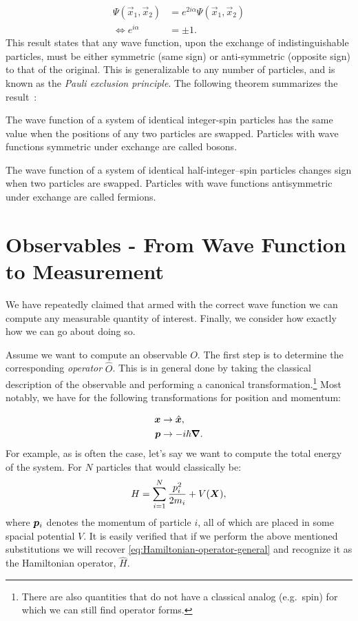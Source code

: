 \documentclass[Thesis.tex]{subfiles}
\begin{document}
\begin{align}
    \Psi(\vec x_1,\vec x_2) &= e^{2i\alpha}\Psi(\vec x_1, \vec x_2)\\
    \iff e^{i\alpha} &= \pm 1.
\end{align}
This result states that any wave function, upon the exchange of
indistinguishable particles, must be either symmetric (same sign) or
anti-symmetric (opposite sign) to that of the original. This is generalizable to
any number of particles, and is known as the \emph{Pauli exclusion principle}.
The following theorem summarizes the result~\cite{PhysRev-58-716}:

\begin{theorem}\label{theorem:spin-statistic}

    The wave function of a system of identical integer-spin particles has the same value
    when the positions of any two particles are swapped. Particles with wave functions
    symmetric under exchange are called bosons.

    The wave function of a system of identical half-integer–spin particles changes sign
    when two particles are swapped. Particles with wave functions antisymmetric under
    exchange are called fermions.
\end{theorem}

\section{Observables - From Wave Function to Measurement}
\label{sec:obs-from-psi-to-Q}

We have repeatedly claimed that armed with the correct wave function we can compute any
measurable quantity of interest. Finally, we consider how exactly how we can go
about doing so.

Assume we want to compute an observable $O$. The first step is to determine the
corresponding \emph{operator} $\hat O$. This is in general done by taking the classical
description of the observable and performing a canonical transformation.\footnote{There are
also quantities that do not have a classical analog (e.g.\ spin) for which we can still
find operator forms.} Most notably, we have for the following transformations for
position and momentum:

\begin{align}
    \bm{x} &\rightarrow \hat{\bm{x}},\\
    \bm{p} &\rightarrow -i\hbar\grad.
\end{align}
For example, as is often the case, let's say we want to compute the total energy of the
system. For $N$ particles that would classically be:
\begin{align}
    H = \sum_{i=1}^N \frac{p_i^2}{2m_i} + V(\bm{X}),
\end{align}
where $\bm{p}_i$ denotes the momentum of particle $i$, all of which are placed in some
spacial potential $V$. It is easily verified that if we perform the above mentioned
substitutions we will recover \cref{eq:Hamiltonian-operator-general} and recognize
it as the Hamiltonian operator, $\hat H$.
\end{document}
